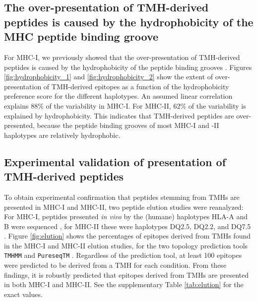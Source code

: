 \subsection{The over-presentation of TMH-derived peptides is caused by the hydrophobicity of the MHC peptide binding groove}

For MHC-I, we previously showed that the over-presentation of TMH-derived 
peptides is caused by the hydrophobicity of the peptide binding 
grooves \cite{bianchi2017}. 
Figures \ref{fig:hydrophobicity_1} and \ref{fig:hydrophobicity_2}
show the extent of over-presentation
of TMH-derived epitopes as a function of the hydrophobicity preference score 
for the different haplotypes.
An assumed linear correlation explains 88\% of the variability in MHC-I.
For MHC-II, 62\% of the variability is explained by hydrophobicity. 
This indicates that TMH-derived peptides are over-presented, 
because the peptide binding grooves of most MHC-I and -II haplotypes 
are relatively hydrophobic.

\subsection{Experimental validation of presentation of TMH-derived peptides}

To obtain experimental confirmation that peptides stemming from TMHs 
are presented in MHC-I and MHC-II,
two peptide elution studies were reanalyzed:
For MHC-I, peptides presented \emph{in vivo} 
by the (humane) haplotypes HLA-A and B 
were sequenced \cite{schellens2015comprehensive},
for MHC-II these were haplotypes DQ2.5, DQ2.2, and 
DQ7.5 \cite{bergseng2015different}.
Figure \ref{fig:elution} shows the percentages of epitopes derived 
from TMHs
found in the MHC-I and MHC-II elution 
studies,
for the two topology prediction tools \verb;TMHMM; \cite{krogh2001predicting} 
and \verb;PureseqTM; \cite{wang2019efficient}. 
Regardless of the prediction tool, 
at least 100 epitopes were predicted to be derived from a TMH for each condition. 
From these findings, it is robustly predicted that
epitopes derived from TMHs are presented in both MHC-I and MHC-II.
See the supplementary Table \ref{tab:elution} for the exact values.

